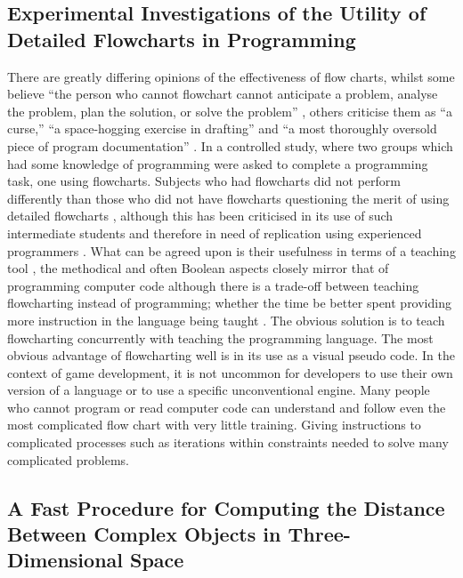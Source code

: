 \documentclass{scrartcl}
\begin{document}
\subsection*{Experimental Investigations of the Utility of Detailed Flowcharts in Programming \cite{shneiderman1977experimental}}

There are greatly differing opinions of the effectiveness of flow charts, whilst some believe ``the person who cannot flowchart cannot anticipate a problem, analyse the problem, plan the solution, or solve the problem''  \cite{shneiderman1977experimental}, others criticise them as ``a curse,'' ``a space-hogging exercise in drafting'' and ``a most thoroughly oversold piece of program documentation'' \cite{shneiderman1977experimental}. In a controlled study, where two groups which had some knowledge of programming were asked to complete a programming task, one using flowcharts. Subjects who had flowcharts did not perform differently than those who did not have flowcharts \cite{shneiderman1977experimental} questioning the merit of using detailed flowcharts  \cite{basili1986experimentation}, although this has been criticised in its use of such intermediate students and therefore in need of replication using experienced programmers \cite{brooks1980studying}. What can be agreed upon is their usefulness in terms of a teaching tool \cite{boyles2014investigation}, the methodical and often Boolean aspects closely mirror that of programming computer code although there is a trade-off between teaching flowcharting instead of programming; whether the time be better spent providing more instruction in the language being taught  \cite{gill2004teaching}. The obvious solution is to teach flowcharting concurrently with teaching the programming language. The most obvious advantage of flowcharting well is in its use as a visual pseudo code. In the context of game development, it is not uncommon for developers to use their own version of a language or to use a specific unconventional engine. Many people who cannot program or read computer code can understand and follow even the most complicated flow chart with very little training. Giving instructions to complicated processes such as iterations within constraints needed to solve many complicated problems.

\subsection*{A Fast Procedure for Computing the Distance Between Complex Objects in Three-Dimensional Space \cite{gilbert1988fast}}
\end{document}
